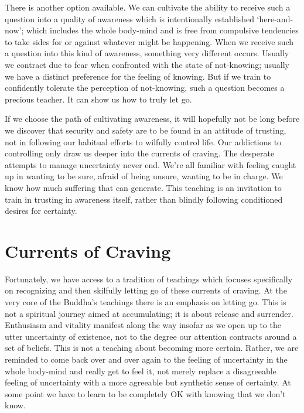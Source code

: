 There is another option available. We can cultivate the ability to
receive such a question into a quality of awareness which is
intentionally established ‘here-and-now’; which includes the whole
body-mind and is free from compulsive tendencies to take sides for or
against whatever might be happening. When we receive such a question
into this kind of awareness, something very different occurs. Usually we
contract due to fear when confronted with the state of
not-knowing; usually we have a distinct preference for the feeling of
knowing. But if we train to confidently tolerate the perception of
not-knowing, such a question becomes a precious teacher. It can show us
how to truly let go.

If we choose the path of cultivating awareness, it will hopefully not be
long before we discover that security and safety are to be found in an
attitude of trusting, not in following our habitual efforts to wilfully
control life. Our addictions to controlling only draw us deeper into the
currents of craving. The desperate attempts to manage uncertainty never
end. We’re all familiar with feeling caught up in wanting to be sure,
afraid of being unsure, wanting to be in charge. We know how much
suffering that can generate. This teaching is an invitation to train in
trusting in awareness itself, rather than blindly following conditioned
desires for certainty.

\section{Currents of Craving}

Fortunately, we have access to a tradition of teachings which focuses
specifically on recognizing and then skilfully letting go of these
currents of craving. At the very core of the Buddha’s teachings there is
an emphasis on letting go. This is not a spiritual journey aimed at
accumulating; it is about release and surrender. Enthusiasm and vitality
manifest along the way insofar as we open up to the utter uncertainty of
existence, not to the degree our attention contracts around a set of
beliefs. This is not a teaching about becoming more certain. Rather, we
are reminded to come back over and over again to the feeling of
uncertainty in the whole body-mind and really get to feel it, not merely
replace a disagreeable feeling of uncertainty with a more agreeable but
synthetic sense of certainty. At some point we have to learn to be
completely OK with knowing that we don’t know.

